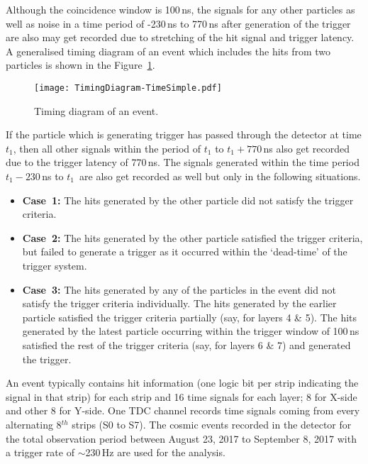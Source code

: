 Although the coincidence window is 100\,ns, the signals for any other
particles as well as noise in a time period of -230\,ns to 770\,ns
after generation of the trigger are also may get recorded due to
stretching of the hit signal and trigger latency. A generalised timing
diagram of an event which includes the hits from two particles is
shown in the Figure~\ref{fig:timingdiagram}.
\begin{figure}[h]
  \texttt{[image: TimingDiagram-TimeSimple.pdf]} 
  \caption{Timing diagram of an event.}
  \label{fig:timingdiagram}
\end{figure}
If the particle which is generating trigger has passed through the
detector at time $t_{1}$, then all other signals within the period of
$t_{1}$ to $t_{1}+770$\,ns also get recorded due to the trigger latency
of 770\,ns. The signals generated within the time period
$t_{1}-230$\,ns to $t_{1}$\ are also get recorded as well but only in
the following situations.
\vspace*{-10pt}
\begin{itemize} \itemsep -5pt
\item \textbf{Case~1:} The hits generated by the other particle did
  not satisfy the trigger criteria.
\item \textbf{Case~2:} The hits generated by the other particle
  satisfied the trigger criteria, but failed to generate a trigger
  as it occurred within the `dead-time' of the trigger system.
\item \textbf{Case~3:} The hits generated by any of the particles in
  the event did not satisfy the trigger criteria individually.
  The hits generated by the earlier particle satisfied the trigger
  criteria partially (say, for layers 4 \& 5). The hits generated by
  the latest particle occurring within the trigger window of 100\,ns
  satisfied the rest of the trigger criteria (say, for layers 6 \& 7)
  and generated the trigger.
\end{itemize}
\vspace*{-10pt}

An event typically contains hit information (one logic bit per strip
indicating the signal in that strip) for each strip and 16 time
signals for each layer; 8 for X-side and other 8 for Y-side.
One TDC channel records time signals coming from every alternating
8$^{th}$ strips (S0 to S7).
The cosmic events recorded in the detector for the total observation
period between August 23, 2017 to September 8, 2017 with a trigger
rate of $\sim$230\,Hz are used for the analysis.


